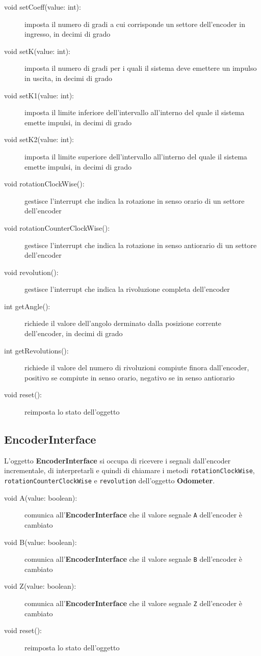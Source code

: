 \documentclass [11pt,a4paper,oneside]{paper}
\newcommand{\component}[1]{\textbf{#1}}
\newcommand{\identifier}[1]{\texttt{#1}}
\begin{document}
\begin{description}
\item[void setCoeff(value: int):] imposta il numero di gradi a
     cui corrisponde un settore dell'encoder in ingresso, in decimi
     di grado
\item[void setK(value: int):] imposta il numero di gradi per i
     quali il sistema deve emettere un impulso in uscita, in decimi
     di grado
\item[void setK1(value: int):] imposta il limite inferiore
     dell'intervallo all'interno del quale il sistema emette impulsi,
     in decimi di grado
\item[void setK2(value: int):] imposta il limite superiore 
     dell'intervallo all'interno del quale il sistema emette impulsi,
     in decimi di grado
\item[void rotationClockWise():] gestisce l'interrupt che indica la
     rotazione in senso orario di un settore dell'encoder
\item[void rotationCounterClockWise():] gestisce l'interrupt che indica
     la rotazione in senso antiorario di un settore dell'encoder
\item[void revolution():] gestisce l'interrupt che indica la
     rivoluzione completa dell'encoder
\item[int getAngle():] richiede il valore dell'angolo derminato
     dalla posizione corrente dell'encoder, in decimi di grado
\item[int getRevolutions():] richiede il valore del numero di rivoluzioni
    compiute finora dall'encoder, positivo se compiute in senso orario,
    negativo se in senso antiorario
\item[void reset():] reimposta lo stato dell'oggetto
\end{description}

\subsection{EncoderInterface}
L'oggetto \component{EncoderInterface} si occupa di ricevere i segnali
dall'encoder incrementale, di interpretarli e quindi di chiamare i
metodi \identifier{rotationClockWise}, \identifier{rotationCounterClockWise}
e \identifier{revolution} dell'oggetto \component{Odometer}.

\begin{description}
\item[void A(value: boolean):] comunica all'\component{EncoderInterface} che
    il valore segnale \identifier{A} dell'encoder è cambiato
\item[void B(value: boolean):] comunica all'\component{EncoderInterface} che
    il valore segnale \identifier{B} dell'encoder è cambiato
\item[void Z(value: boolean):] comunica all'\component{EncoderInterface} che
    il valore segnale \identifier{Z} dell'encoder è cambiato
\item[void reset():] reimposta lo stato dell'oggetto
\end{description}
\end{document}
